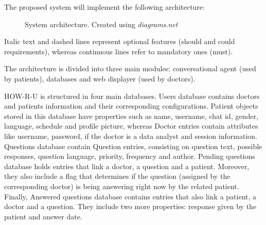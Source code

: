\documentclass[12pt,english]{article}
\begin{document}
The proposed system will implement the following architecture:
\begin{figure}[H]
    \caption{System architecture. Created using \emph{diagrams.net} \protect\cite{drawio}}
\end{figure}

Italic text and dashed lines represent optional features (should and could requirements), whereas continuous  lines refer to mandatory ones (must).

The architecture is divided into three main modules: conversational agent (used by patients), databases and web displayer (used by doctors).

HOW-R-U is structured in four main databases. Users database contains doctors and patients information and their corresponding configurations. Patient objects stored in this database have properties such as name, username, chat id, gender, language, schedule and profile picture, whereas Doctor entries contain attributes like username, password, if the doctor is a data analyst and session information. Questions database contain Question entries, consisting on question text, possible responses, question language, priority, frequency and author. Pending questions database holds entries that link a doctor, a question and a patient. Moreover, they also include a flag that determines if the question (assigned by the corresponding doctor) is being answering right now by the related patient. Finally, Answered questions database contains entries that also link a patient, a doctor and a question. They include two more properties: response given by the patient and answer date.
\end{document}
